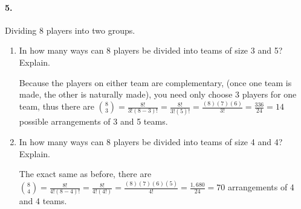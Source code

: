     \pagebreak

    \paragraph*{5.}
    Dividing 8 players into two groups.

    \begin{enumerate}[label=(\alph*)]
        \item In how many ways can 8 players be divided into teams of size 3 and 5? Explain.
        
        \begin{mdframed}
            Because the players on either team are complementary, (once one team is made, the other is naturally made), you need only choose 3 players for one team, thus there are ${8 \choose 3} = \frac{8!}{3!(8-3)!} = \frac{8!}{3!(5)!} = \frac{(8)(7)(6)}{3!} = \frac{336}{24} = \boxed{14}$ possible arrangements of 3 and 5 teams.
        \end{mdframed}

        \item In how many ways can 8 players be divided into teams of size 4 and 4? Explain.
        
        \begin{mdframed}
            The exact same as before, there are ${8 \choose 4} = \frac{8!}{4!(8-4)!} = \frac{8!}{4!(4!)} = \frac{(8)(7)(6)(5)}{4!} = \frac{1,680}{24} = \boxed{70}$ arrangements of 4 and 4 teams.
        \end{mdframed}

    \end{enumerate}

